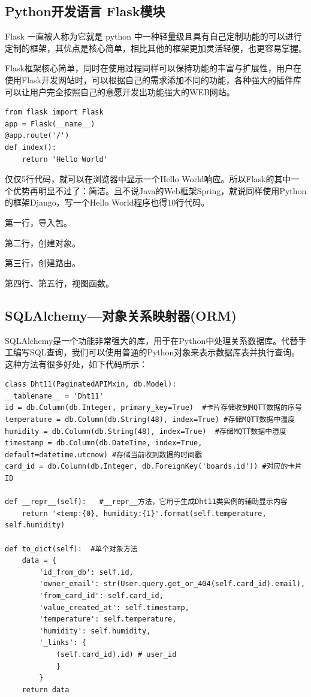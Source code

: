 \subsection{Python开发语言 Flask模块}

Flask 一直被人称为它就是 python 中一种轻量级且具有自己定制功能的可以进行定制的框架，其优点是核心简单，相比其他的框架更加灵活轻便，也更容易掌握。

Flask框架核心简单，同时在使用过程同样可以保持功能的丰富与扩展性，用户在使用Flask开发网站时，可以根据自己的需求添加不同的功能，各种强大的插件库可以让用户完全按照自己的意愿开发出功能强大的WEB网站。

\begin{lstlisting}[title=代码 3-1：Flask简单示例]
from flask import Flask
app = Flask(__name__)
@app.route('/')
def index():
    return 'Hello World'
\end{lstlisting}

仅仅5行代码，就可以在浏览器中显示一个Hello World响应。所以Flask的其中一个优势再明显不过了：简洁。且不说Java的Web框架Spring，就说同样使用Python的框架Django，写一个Hello World程序也得10行代码。

第一行，导入包。

第二行，创建对象。

第三行，创建路由。

第四行、第五行，视图函数。

\subsection{SQLAlchemy---对象关系映射器(ORM)}

SQLAlchemy是一个功能非常强大的库，用于在Python中处理关系数据库。代替手工编写SQL查询，我们可以使用普通的Python对象来表示数据库表并执行查询。这种方法有很多好处，如下代码所示：

\begin{lstlisting}[title=DHT11数据表对象数据表模型]
class Dht11(PaginatedAPIMxin, db.Model):
__tablename__ = 'Dht11'
id = db.Column(db.Integer, primary_key=True)  #卡片存储收到MQTT数据的序号
temperature = db.Column(db.String(48), index=True) #存储MQTT数据中温度
humidity = db.Column(db.String(48), index=True)  #存储MQTT数据中湿度
timestamp = db.Column(db.DateTime, index=True, default=datetime.utcnow) #存储当前收到数据的时间戳
card_id = db.Column(db.Integer, db.ForeignKey('boards.id')) #对应的卡片ID

def __repr__(self):   #__repr__方法，它用于生成Dht11类实例的辅助显示内容
	return '<temp:{0}, humidity:{1}'.format(self.temperature, self.humidity)

def to_dict(self):  #单个对象方法
	data = {
		'id_from_db': self.id,
		'owner_email': str(User.query.get_or_404(self.card_id).email),
		'from_card_id': self.card_id,
		'value_created_at': self.timestamp,
		'temperature': self.temperature,
		'humidity': self.humidity,
		'_links': {
			(self.card_id).id) # user_id
			}
		}
	return data
\end{lstlisting}

